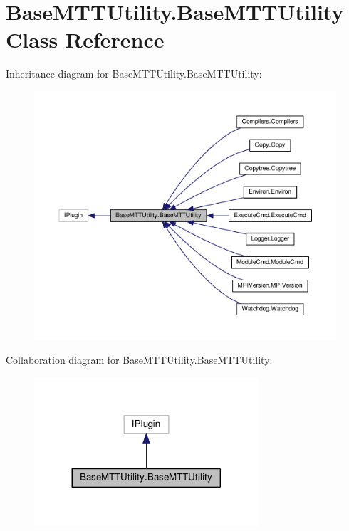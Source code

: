 \hypertarget{class_base_m_t_t_utility_1_1_base_m_t_t_utility}{\section{Base\-M\-T\-T\-Utility.\-Base\-M\-T\-T\-Utility Class Reference}
\label{class_base_m_t_t_utility_1_1_base_m_t_t_utility}
}


Inheritance diagram for Base\-M\-T\-T\-Utility.\-Base\-M\-T\-T\-Utility\-:
\nopagebreak
\begin{figure}[H]
\begin{center}
\leavevmode
\includegraphics[width=350pt]{class_base_m_t_t_utility_1_1_base_m_t_t_utility__inherit__graph}
\end{center}
\end{figure}


Collaboration diagram for Base\-M\-T\-T\-Utility.\-Base\-M\-T\-T\-Utility\-:
\nopagebreak
\begin{figure}[H]
\begin{center}
\leavevmode
\includegraphics[width=236pt]{class_base_m_t_t_utility_1_1_base_m_t_t_utility__coll__graph}
\end{center}
\end{figure}
